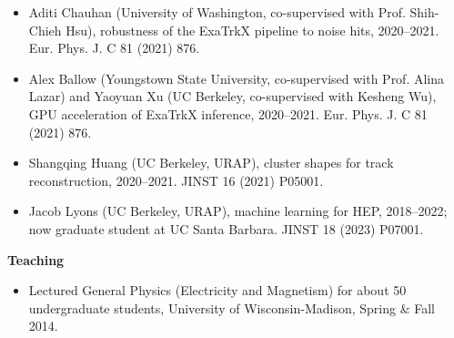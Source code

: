 \begin{itemize}
\item Aditi Chauhan (University of Washington, co-supervised with Prof. Shih-Chieh Hsu), robustness of the ExaTrkX pipeline to noise hits, 2020--2021. Eur. Phys. J. C 81 (2021) 876.
\item Alex Ballow (Youngstown State University, co-supervised with Prof. Alina Lazar) and Yaoyuan Xu (UC Berkeley, co-supervised with Kesheng Wu), GPU acceleration of ExaTrkX inference, 2020--2021. Eur. Phys. J. C 81 (2021) 876.
\item Shangqing Huang (UC Berkeley, URAP), cluster shapes for track reconstruction, 2020--2021. JINST 16 (2021) P05001.
\item Jacob Lyons (UC Berkeley, URAP), machine learning for HEP, 2018--2022; now graduate student at UC Santa Barbara. JINST 18 (2023) P07001.
\end{itemize}

\textbf{Teaching}
\begin{itemize}
\item Lectured General Physics (Electricity and Magnetism) for about 50 undergraduate students, University of Wisconsin-Madison, Spring \& Fall 2014.
\end{itemize}

